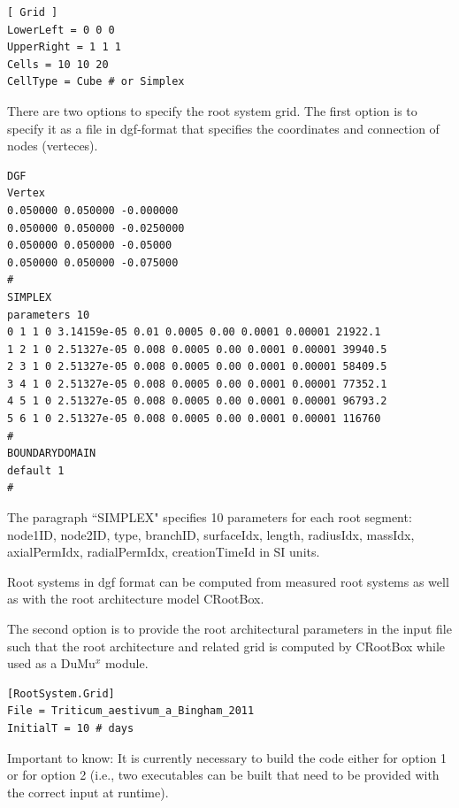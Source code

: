 \begin{lstlisting}
[ Grid ]
LowerLeft = 0 0 0
UpperRight = 1 1 1
Cells = 10 10 20
CellType = Cube # or Simplex
\end{lstlisting}

There are two options to specify the root system grid. The first option is to specify it as a file in dgf-format that specifies the coordinates and connection of nodes (verteces).  

\begin{lstlisting}
DGF
Vertex
0.050000 0.050000 -0.000000
0.050000 0.050000 -0.0250000
0.050000 0.050000 -0.05000
0.050000 0.050000 -0.075000
#
SIMPLEX 
parameters 10 
0 1 1 0 3.14159e-05 0.01 0.0005 0.00 0.0001 0.00001 21922.1 
1 2 1 0 2.51327e-05 0.008 0.0005 0.00 0.0001 0.00001 39940.5 
2 3 1 0 2.51327e-05 0.008 0.0005 0.00 0.0001 0.00001 58409.5 
3 4 1 0 2.51327e-05 0.008 0.0005 0.00 0.0001 0.00001 77352.1 
4 5 1 0 2.51327e-05 0.008 0.0005 0.00 0.0001 0.00001 96793.2 
5 6 1 0 2.51327e-05 0.008 0.0005 0.00 0.0001 0.00001 116760 
#
BOUNDARYDOMAIN
default 1
#
\end{lstlisting}

The paragraph ``SIMPLEX" specifies 10 parameters for each root segment: node1ID, node2ID, type, branchID, surfaceIdx, length, radiusIdx, massIdx, axialPermIdx, radialPermIdx, creationTimeId in SI units. 

Root systems in dgf format can be computed from measured root systems as well as with the root architecture model CRootBox. 

The second option is to provide the root architectural parameters in the input file such that the root architecture and related grid is computed by CRootBox while used as a DuMu$^x$ module. 

\begin{lstlisting}
[RootSystem.Grid]
File = Triticum_aestivum_a_Bingham_2011  
InitialT = 10 # days
\end{lstlisting}

Important to know: It is currently necessary to build the code either for option 1 or for option 2 (i.e., two executables can be built that need to be provided with the correct input at runtime). 